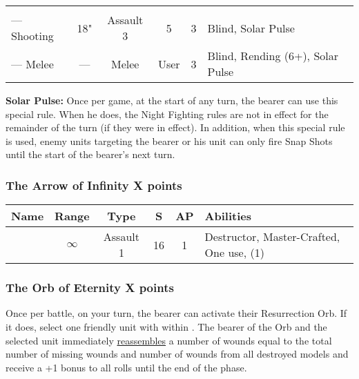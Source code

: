 \label{Solar Staff}
\noindent
\begin{NiceTabular}{m{130 pt} *{4}{c} >{\raggedright\arraybackslash}p{240pt}}
 & & &  &  &  \\
— Shooting & 18" & Assault 3 & 5 & 3 & Blind, Solar Pulse \\
— Melee & — & Melee & User & 3 & Blind, Rending (6+), Solar Pulse \\
\end{NiceTabular}

\textbf{Solar Pulse:} Once per game, at the start of any turn, the bearer can use this special rule. When he does, the Night Fighting rules are not in effect for the remainder of the turn (if they were in effect). In addition, when this special rule is used, enemy units targeting the bearer or his unit can only fire Snap Shots until the start of the bearer’s next turn.

\subsubsection[The Arrow of Infinity]{The Arrow of Infinity \dotfill X points}

\label{The Arrow of Infinity Arrow}
\noindent
\begin{NiceTabular}{m{130 pt} *{4}{c} >{\raggedright\arraybackslash}p{240pt}}
	Name & Range & Type & S & AP & Abilities \\
	\hline
	  & $\infty$ & Assault 1 & 16 & 1 & Destructor, Master-Crafted, One use,  (1) \\
\end{NiceTabular}

\subsubsection[The Orb of Eternity]{The Orb of Eternity \dotfill X points}

Once per battle, on your turn, the bearer can activate their Resurrection Orb. If it does, select one friendly unit with  within . The bearer of the Orb and the selected unit immediately \textcolor{violet}{\hyperref[Reanimation Protocols]{reassembles}} a number of wounds equal to the total number of missing wounds and number of wounds from all destroyed models and receive a +1 bonus to all  rolls until the end of the phase.

